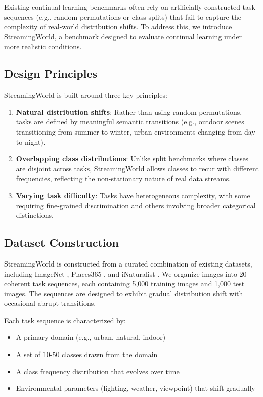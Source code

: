 \documentclass[11pt]{article}
\begin{document}
Existing continual learning benchmarks often rely on artificially constructed task sequences (e.g., random permutations or class splits) that fail to capture the complexity of real-world distribution shifts. To address this, we introduce StreamingWorld, a benchmark designed to evaluate continual learning under more realistic conditions.

\subsection{Design Principles}

StreamingWorld is built around three key principles:
\begin{enumerate}
    \item \textbf{Natural distribution shifts}: Rather than using random permutations, tasks are defined by meaningful semantic transitions (e.g., outdoor scenes transitioning from summer to winter, urban environments changing from day to night).
    \item \textbf{Overlapping class distributions}: Unlike split benchmarks where classes are disjoint across tasks, StreamingWorld allows classes to recur with different frequencies, reflecting the non-stationary nature of real data streams.
    \item \textbf{Varying task difficulty}: Tasks have heterogeneous complexity, with some requiring fine-grained discrimination and others involving broader categorical distinctions.
\end{enumerate}

\subsection{Dataset Construction}

StreamingWorld is constructed from a curated combination of existing datasets, including ImageNet \citep{deng2009imagenet}, Places365 \citep{zhou2017places}, and iNaturalist \citep{van2018inaturalist}. We organize images into 20 coherent task sequences, each containing 5,000 training images and 1,000 test images. The sequences are designed to exhibit gradual distribution shift with occasional abrupt transitions.

Each task sequence is characterized by:
\begin{itemize}
    \item A primary domain (e.g., urban, natural, indoor)
    \item A set of 10-50 classes drawn from the domain
    \item A class frequency distribution that evolves over time
    \item Environmental parameters (lighting, weather, viewpoint) that shift gradually
\end{itemize}
\end{document}
